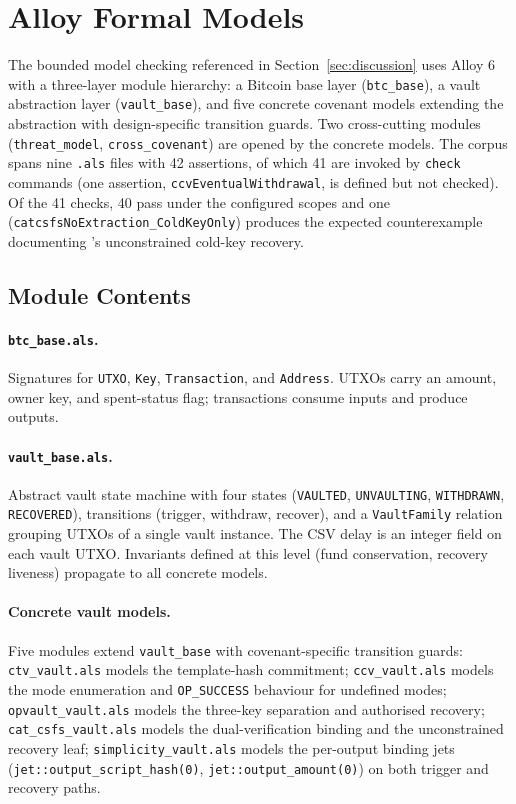 
\section{Alloy Formal Models}
\label{app:alloy}

The bounded model checking referenced in Section~\ref{sec:discussion}
uses Alloy 6 with a three-layer module hierarchy: a Bitcoin base
layer (\texttt{btc\_base}), a vault abstraction layer
(\texttt{vault\_base}), and five concrete covenant models extending
the abstraction with design-specific transition guards. Two
cross-cutting modules (\texttt{threat\_model},
\texttt{cross\_covenant}) are opened by the concrete models. The
corpus spans nine \texttt{.als} files with 42 assertions, of which 41
are invoked by \texttt{check} commands (one assertion,
\texttt{ccvEventualWithdrawal}, is defined but not checked). Of the
41 checks, 40 pass under the configured scopes and one
(\texttt{catcsfsNoExtraction\_ColdKeyOnly}) produces the expected
counterexample documenting \catcsfs{}'s unconstrained cold-key
recovery.

\subsection{Module Contents}

\paragraph{\texttt{btc\_base.als}.}
Signatures for \texttt{UTXO}, \texttt{Key}, \texttt{Transaction},
and \texttt{Address}. UTXOs carry an amount, owner key, and
spent-status flag; transactions consume inputs and produce outputs.

\paragraph{\texttt{vault\_base.als}.}
Abstract vault state machine with four states (\texttt{VAULTED},
\texttt{UNVAULTING}, \texttt{WITHDRAWN}, \texttt{RECOVERED}),
transitions (trigger, withdraw, recover), and a \texttt{VaultFamily}
relation grouping UTXOs of a single vault instance. The CSV delay
is an integer field on each vault UTXO. Invariants defined at this
level (fund conservation, recovery liveness) propagate to all
concrete models.

\paragraph{Concrete vault models.}
Five modules extend \texttt{vault\_base} with covenant-specific
transition guards: \texttt{ctv\_vault.als} models the template-hash
commitment; \texttt{ccv\_vault.als} models the mode enumeration and
\texttt{OP\_SUCCESS} behaviour for undefined modes;
\texttt{opvault\_vault.als} models the three-key separation and
authorised recovery; \texttt{cat\_csfs\_vault.als} models the
dual-verification binding and the unconstrained recovery leaf;
\texttt{simplicity\_vault.als} models the per-output binding jets
(\texttt{jet::output\_script\_hash(0)}, \texttt{jet::output\_amount(0)})
on both trigger and recovery paths.


